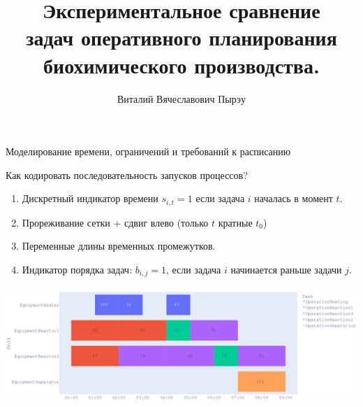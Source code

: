 \documentclass{beamer}
\title[\hbox to 56mm{Задачи планирования}]{	Экспериментальное сравнение \\ задач оперативного планирования биохимического производства.}
\author[В.\,В. Пырэу]{Виталий Вячеславович Пырэу}
\institute{Московский физико-технический институт}
\date{\footnotesize
\par\smallskip\emph{Курс:} Автоматизация научных исследований\par (практика, В.\,В.~Стрижов)/Группа Б05-821
\par\smallskip\emph{Эксперт:} С.\,А.~Тренин
\par\bigskip\small 2021}
\begin{document}
\begin{frame}
\thispagestyle{empty}
\maketitle
\end{frame}
\begin{frame}{Моделирование времени, ограничений и требований к расписанию}

Как кодировать последовательность запусков процессов?

\begin{enumerate}
	\item Дискретный индикатор времени $s_{i, t} = 1$ если задача $i$ началась в момент $t$.
	\item Прореживание сетки + сдвиг влево (только $t$ кратные $t_0$)
	\item Переменные длины временных промежутков.
	\item Индикатор порядка задач: $b_{i, j} = 1$, если задача $i$ начинается раньше задачи $j$.
\end{enumerate}

\includegraphics[width=1.0\textwidth]{Plan}

\end{frame}
\end{document}

